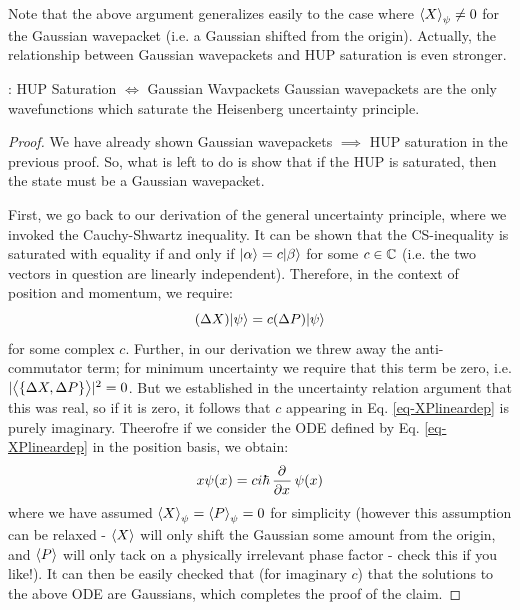 Note that the above argument generalizes easily to the case where $\left< X \right>_\psi \neq 0$ for the Gaussian wavepacket (i.e. a Gaussian shifted from the origin).
Actually, the relationship between Gaussian wavepackets and HUP saturation is even stronger.

\begin{propbox}{: HUP Saturation $\iff$ Gaussian Wavpackets}\label{prop-GaussianHUPsaturation}
    Gaussian wavepackets are the only wavefunctions which saturate the Heisenberg uncertainty principle.
\end{propbox}
\begin{proof}
    We have already shown Gaussian wavepackets $\implies$ HUP saturation in the previous proof. So, what is left to do is show that if the HUP is saturated, then the state must be a Gaussian wavepacket.

    First, we go back to our derivation of the general uncertainty principle, where we invoked the Cauchy-Shwartz inequality. It can be shown that the CS-inequality is saturated with equality if and only if $\lvert \alpha \rangle = c\lvert \beta \rangle$ for some $c \in \mathbb{C}$ (i.e. the two vectors in question are linearly independent). Therefore, in the context of position and momentum, we require:
    \begin{equation}\label{eq-XPlineardep}
        (\Delta X)\lvert \psi \rangle = c(\Delta P)\lvert \psi \rangle
    \end{equation}
    for some complex $c$. Further, in our derivation we threw away the anti-commutator term; for minimum uncertainty we require that this term be zero, i.e. $\lvert \left< \set{\Delta X, \Delta P} \right> \rvert^2 = 0$. But we established in the uncertainty relation argument that this was real, so if it is zero, it follows that $c$ appearing in Eq. \eqref{eq-XPlineardep} is purely imaginary. Theerofre if we consider the ODE defined by Eq. \eqref{eq-XPlineardep} in the position basis, we obtain:
    \begin{equation}
        x\psi(x) = ci\hbar\dpd{}{x}\psi(x)
    \end{equation}
    where we have assumed $\left< X \right>_\psi = \left< P \right>_\psi = 0$ for simplicity (however this assumption can be relaxed - $\left< X \right>$ will only shift the Gaussian some amount from the origin, and $\left< P \right>$ will only tack on a physically irrelevant phase factor - check this if you like!). It can then be easily checked that (for imaginary $c$) that the solutions to the above ODE are Gaussians, which completes the proof of the claim.
\end{proof}

